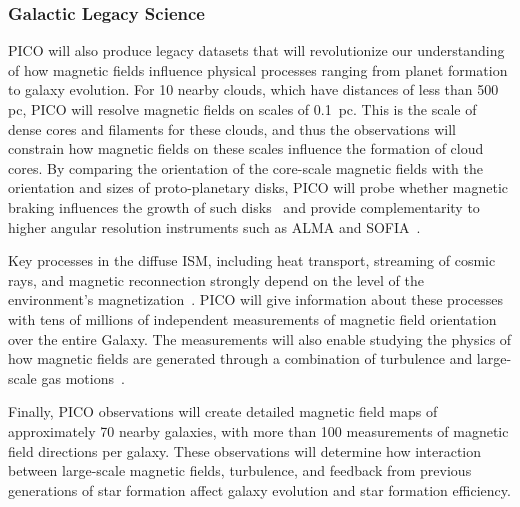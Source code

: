 \documentclass[PICOReport.tex]{subfiles}
\begin{document}
\subsubsection{Galactic Legacy Science}
\label{sec:galactic_legacy}

PICO will also produce legacy datasets that will revolutionize our understanding of how magnetic fields influence physical processes ranging from planet formation to galaxy evolution.  For 10 nearby clouds, which have distances of less than 500 pc, PICO will resolve magnetic fields on scales of 0.1~pc. This is the scale of dense cores and filaments for these clouds, and thus the observations will constrain how magnetic fields on these scales influence the formation of cloud cores.  By comparing the orientation of the core-scale magnetic fields with the orientation and sizes of proto-planetary disks, PICO will probe whether magnetic braking influences the growth of such disks~\citep{allen_2003,li_2014} and provide complementarity to higher angular resolution instruments such as ALMA and SOFIA~\citep{Bacciotti2018ApJ,Harper2018}.

Key processes in the diffuse ISM, including heat transport, streaming of cosmic rays, and magnetic reconnection strongly depend on the level of the environment's magnetization~\citep{Lazarian:2006,Lazarian:2016,Lazarian_Vishniac:1999}.
PICO will give information about these processes with tens of millions of independent measurements of magnetic field orientation over the entire Galaxy. The measurements will also enable studying the physics of how magnetic fields are generated through a combination of turbulence and large-scale gas motions~\citep{Xu_2018}.

Finally, PICO observations will create detailed magnetic field maps of approximately 70 nearby galaxies, with more than 100 measurements of magnetic field directions per galaxy. These observations will determine how interaction between large-scale magnetic fields, turbulence, and feedback from previous generations of star formation affect galaxy evolution and star formation efficiency.
\end{document}
